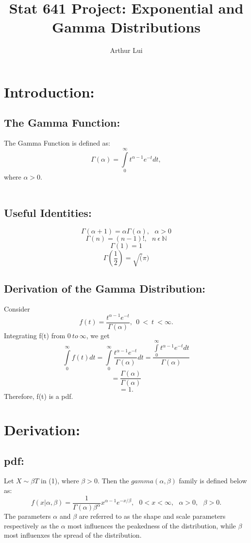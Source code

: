 \documentclass{article}
\begin{document}
\title{Stat 641 Project: Exponential and Gamma Distributions}
\author{Arthur Lui}
\maketitle
\def\wl{\par \vspace{\baselineskip}}


\section*{Introduction:}

  \subsection*{The Gamma Function:}
    The Gamma Function is defined as:
    \[
      \Gamma (\alpha) = \int\limits_0^\infty {t^{\alpha - 1} e^{-t} dt},
    \]
    where $\alpha > 0$.\\\\
   \subsection*{ Useful Identities:}
    \[
      \Gamma(\alpha+1) = \alpha\Gamma(\alpha), ~~~\alpha > 0
    \]
    \[
      \Gamma(n) = (n-1)!, ~~~ n ~ \epsilon ~ \mathbb{N}
    \]
    \[
      \Gamma(1) = 1
    \]
    \[
      \Gamma(\frac{1}{2}) = \sqrt(\pi)
    \]
  \subsection*{Derivation of the Gamma Distribution:}
     Consider
     \[
        f(t) = \frac{t^{\alpha-1} e^{-t}}{\Gamma(\alpha)},~~0~<~t~<\infty.
     \] 
     Integrating f(t) from $0~to~\infty$, we get
     \[
        \int\limits_0^\infty {f(t) dt} = 
        \int\limits_0^\infty {\frac{t^{\alpha - 1} e^{-t}}{\Gamma(\alpha)} dt} =
        \frac{\int\limits_0^\infty {t^{\alpha - 1} e^{-t}} dt}{\Gamma(\alpha)}
     \]
     \[
        = \frac{\Gamma(\alpha)}{\Gamma(\alpha)}
     \]
     \begin{equation} 
        = 1.
     \end{equation}
     Therefore, f(t) is a pdf. 

\section*{Derivation:}

  \subsection*{pdf:}
  Let $X \sim \beta T $ in (1), where $\beta > 0$. Then the $ gamma(\alpha,\beta) $ family is defined below as:
  \[
    f(x|\alpha,\beta) = \frac{1}{\Gamma(\alpha)\beta^\alpha}x^{\alpha-1}e^{-x/\beta}, ~~~ 0<x<\infty,~~~\alpha>0,~~~\beta>0.
  \]
  The parameters $\alpha$ and $\beta$ are referred to as the shape and scale parameters respectively as the $\alpha$ most influences the peakedness of the distribution, while $\beta$ most influenxes the spread of the distribution.
\end{document}
